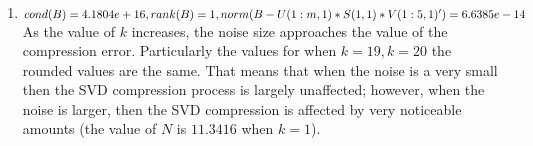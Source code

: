 \documentclass{article}
\begin{document}
\begin{enumerate}
\begin{enumerate}
    \end{enumerate}
    
    \item
    
    $cond(B)=4.1804e+16,\\rank(B)=1, \\norm(B-U(1:m,1)*S(1,1)*V(1:5,1)')=6.6385e-14$\\
    As the value of $k$ increases, the noise size approaches the value of the compression error. Particularly the values for when $k=19, k=20$ the rounded values are the same. That means that when the noise is a very small then the SVD compression process is largely unaffected; however, when the noise is larger, then the SVD compression is affected by very noticeable amounts (the value of $N$ is $11.3416$ when $k=1$).
    
\end{enumerate}
\end{document}
